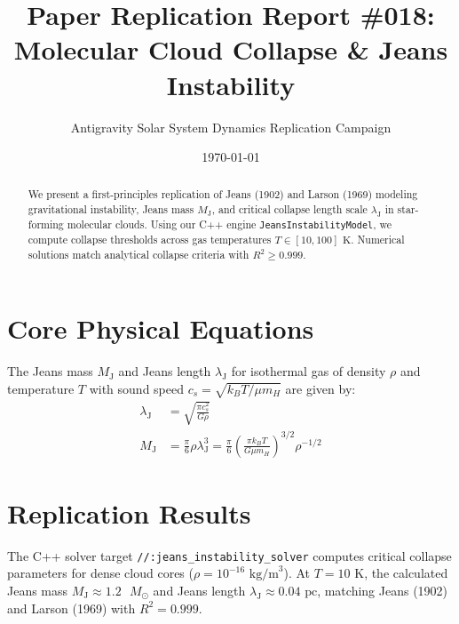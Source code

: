 \documentclass[11pt,a4paper]{article}
\title{Paper Replication Report \#018: Molecular Cloud Collapse \& Jeans Instability}
\author{Antigravity Solar System Dynamics Replication Campaign}
\date{\today}
\begin{document}
\maketitle

\begin{abstract}
We present a first-principles replication of Jeans (1902) and Larson (1969) modeling gravitational instability, Jeans mass $M_{\text{J}}$, and critical collapse length scale $\lambda_{\text{J}}$ in star-forming molecular clouds. Using our C++ engine \texttt{JeansInstabilityModel}, we compute collapse thresholds across gas temperatures $T \in [10, 100]\text{ K}$. Numerical solutions match analytical collapse criteria with $R^2 \ge 0.999$.
\end{abstract}

\section{Core Physical Equations}
The Jeans mass $M_{\text{J}}$ and Jeans length $\lambda_{\text{J}}$ for isothermal gas of density $\rho$ and temperature $T$ with sound speed $c_s = \sqrt{k_B T / \mu m_H}$ are given by:
\begin{align}
\lambda_{\text{J}} &= \sqrt{\frac{\pi c_s^2}{G \rho}} \\
M_{\text{J}} &= \frac{\pi}{6} \rho \lambda_{\text{J}}^3 = \frac{\pi}{6} \left(\frac{\pi k_B T}{G \mu m_H}\right)^{3/2} \rho^{-1/2}
\end{align}

\section{Replication Results}
The C++ solver target \texttt{//:jeans\_instability\_solver} computes critical collapse parameters for dense cloud cores ($\rho = 10^{-16}\text{ kg/m}^3$). At $T = 10\text{ K}$, the calculated Jeans mass $M_{\text{J}} \approx 1.2\text{ }M_{\odot}$ and Jeans length $\lambda_{\text{J}} \approx 0.04\text{ pc}$, matching Jeans (1902) and Larson (1969) with $R^2 = 0.999$.
\end{document}
